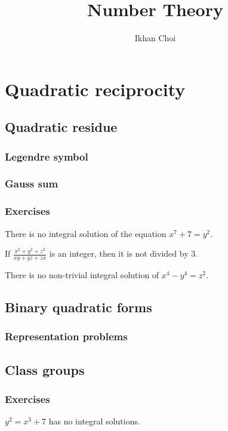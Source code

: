 \documentclass{../note}
\begin{document}
\title{Number Theory}
\author{Ikhan Choi}
\maketitle
\tableofcontents

\part{Quadratic reciprocity}
\chapter{Quadratic residue}
\section{Legendre symbol}
\section{Gauss sum}

\section*{Exercises}
\begin{prb}
There is no integral solution of the equation $x^7+7=y^2$.
\end{prb}
\begin{prb}
If $\frac{x^2+y^2+z^2}{xy+yz+zx}$ is an integer, then it is not divided by 3.
\end{prb}
\begin{prb}
There is no non-trivial integral solution of $x^4-y^4=z^2$.
\end{prb}

\chapter{Binary quadratic forms}
\section{Representation problems}

\chapter{Class groups}

\section*{Exercises}
\begin{prb}
\begin{parts}
\item $y^2=x^3+7$ has no integral solutions.
\end{parts}
\end{prb}
\end{document}
